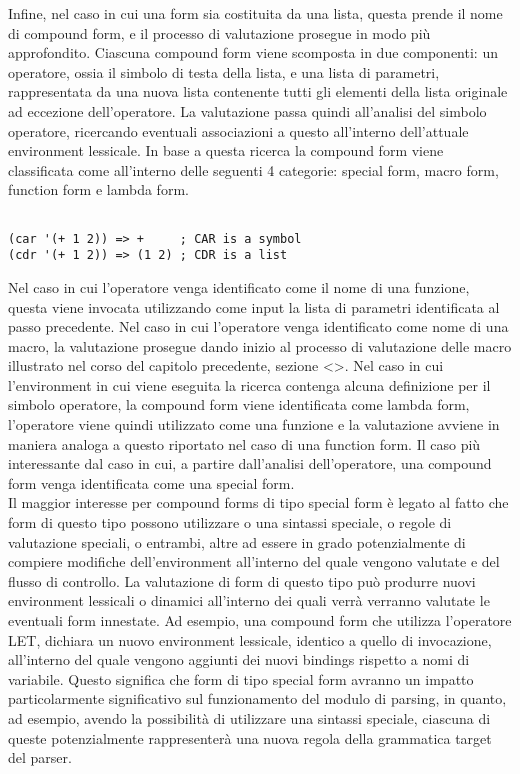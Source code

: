 Infine, nel caso in cui una form sia costituita da una lista, questa prende il nome di compound form, e il processo di valutazione prosegue in modo più approfondito. Ciascuna compound form viene scomposta in due componenti: un operatore, ossia il simbolo di testa della lista, e una lista di parametri, rappresentata da una nuova lista contenente tutti gli elementi della lista originale ad eccezione dell’operatore. La valutazione passa quindi all’analisi del simbolo operatore, ricercando eventuali associazioni a questo all’interno dell’attuale environment lessicale. In base a questa ricerca la compound form viene classificata come all’interno delle seguenti 4 categorie: special form, macro form, function form e lambda form.

\begin{lstlisting}

(car '(+ 1 2)) => +     ; CAR is a symbol
(cdr '(+ 1 2)) => (1 2) ; CDR is a list    

\end{lstlisting}

Nel caso in cui l’operatore venga identificato come il nome di una funzione, questa viene invocata utilizzando come input la lista di parametri identificata al passo precedente. Nel caso in cui l’operatore venga identificato come nome di una macro, la valutazione prosegue dando inizio al processo di valutazione delle macro illustrato nel corso del capitolo precedente, sezione <>. Nel caso in cui l’environment in cui viene eseguita la ricerca contenga alcuna definizione per il simbolo operatore, la compound form viene identificata come lambda form, l’operatore viene quindi utilizzato come una funzione e la valutazione avviene in maniera analoga a questo riportato nel caso di una function form. Il caso più interessante dal caso in cui, a partire dall’analisi dell’operatore, una compound form venga identificata come una special form.\\

Il maggior interesse per compound forms di tipo special form è legato al fatto che form di questo tipo possono utilizzare o una sintassi speciale, o regole di valutazione speciali, o entrambi, altre ad essere in grado potenzialmente di compiere modifiche dell’environment all’interno del quale vengono valutate e del flusso di controllo. La valutazione di form di questo tipo può produrre nuovi environment lessicali o dinamici all’interno dei quali verrà verranno valutate le eventuali form innestate. Ad esempio, una compound form che utilizza l’operatore LET, dichiara un nuovo environment lessicale, identico a quello di invocazione, all’interno del quale vengono aggiunti dei nuovi bindings rispetto a nomi di variabile. Questo significa che form di tipo special form avranno un impatto particolarmente significativo sul funzionamento del modulo di parsing, in quanto, ad esempio, avendo la possibilità di utilizzare una sintassi speciale, ciascuna di queste potenzialmente rappresenterà una nuova regola della grammatica target del parser.\\

